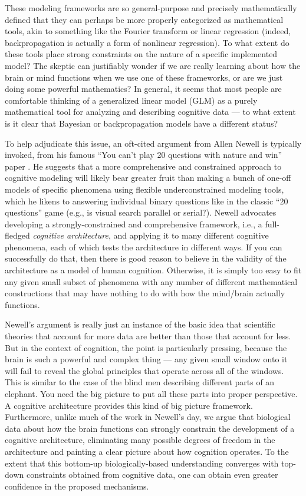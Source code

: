 \documentclass[11pt,twoside]{article}
\begin{document}
These modeling frameworks are so general-purpose and precisely mathematically defined that they can perhaps be more properly categorized as mathematical tools, akin to something like the Fourier transform or linear regression (indeed, backpropagation is actually a form of nonlinear regression).  To what extent do these tools place strong constraints on the nature of a specific implemented model?  The skeptic can justifiably wonder if we are really learning about how the brain or mind functions when we use one of these frameworks, or are we just doing some powerful mathematics?  In general, it seems that most people are comfortable thinking of a generalized linear model (GLM) as a purely mathematical tool for analyzing and describing cognitive data --- to what extent is it clear that Bayesian or backpropagation models have a different status?

To help adjudicate this issue, an oft-cited argument from Allen Newell is typically invoked, from his famous ``You can't play 20 questions with nature and win'' paper \cite{Newell73}.  He suggests that a more comprehensive and constrained approach to cognitive modeling will likely bear greater fruit than making a bunch of one-off models of specific phenomena using flexible underconstrained modeling tools, which he likens to answering individual binary questions like in the classic ``20 questions'' game (e.g., is visual search parallel or serial?).  Newell advocates developing a strongly-constrained and comprehensive framework, i.e., a full-fledged {\em cognitive architecture}, and applying it to many different cognitive phenomena, each of which tests the architecture in different ways.  If you can successfully do that, then there is good reason to believe in the validity of the architecture as a model of human cognition.  Otherwise, it is simply too easy to fit any given small subset of phenomena with any number of different mathematical constructions that may have nothing to do with how the mind/brain actually functions.

Newell's argument is really just an instance of the basic idea that scientific theories that account for more data are better than those that account for less.  But in the context of cognition, the point is particularly pressing, because the brain is such a powerful and complex thing --- any given small window onto it will fail to reveal the global principles that operate across all of the windows.  This is similar to the case of the blind men describing different parts of an elephant.  You need the big picture to put all these parts into proper perspective.  A cognitive architecture provides this kind of big picture framework.  Furthermore, unlike much of the work in Newell's day, we argue that biological data about how the brain functions can strongly constrain the development of a cognitive architecture, eliminating many possible degrees of freedom in the architecture and painting a clear picture about how cognition operates.  To the extent that this bottom-up biologically-based understanding converges with top-down constraints obtained from cognitive data, one can obtain even greater confidence in the proposed mechanisms.
\end{document}
